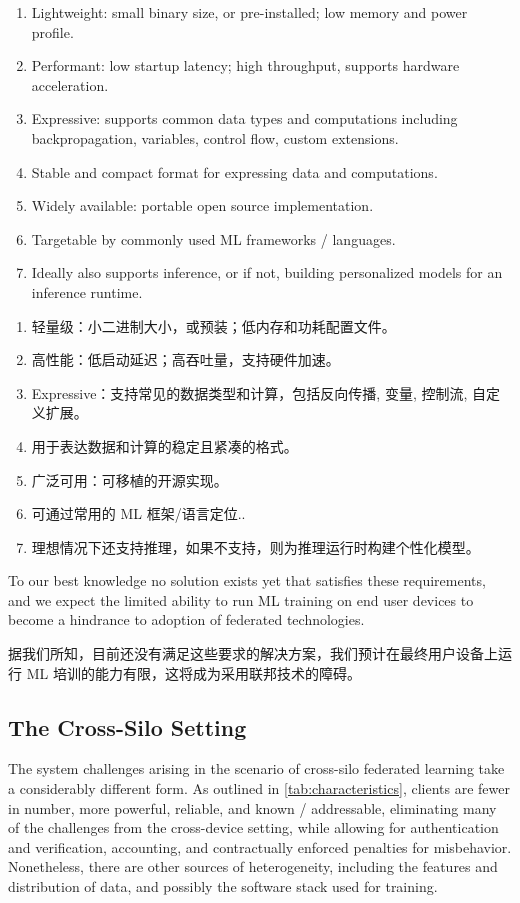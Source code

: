 \begin{enumerate}
    \item Lightweight: small binary size, or pre-installed; low memory and power profile.
    \item Performant: low startup latency; high throughput, supports hardware acceleration.
    \item Expressive: supports common data types and computations including backpropagation, variables, control flow, custom extensions.
    \item Stable and compact format for expressing data and computations.
    \item Widely available: portable open source implementation.
    \item Targetable by commonly used ML frameworks / languages.
    \item Ideally also supports inference, or if not, building personalized models for an inference runtime.
\end{enumerate}
\begin{enumerate}
    \item 轻量级：小二进制大小，或预装；低内存和功耗配置文件。
    \item 高性能：低启动延迟；高吞吐量，支持硬件加速。
    \item Expressive：支持常见的数据类型和计算，包括反向传播, 变量, 控制流, 自定义扩展。
    \item 用于表达数据和计算的稳定且紧凑的格式。
    \item 广泛可用：可移植的开源实现。
    \item 可通过常用的 ML 框架/语言定位..
    \item 理想情况下还支持推理，如果不支持，则为推理运行时构建个性化模型。
\end{enumerate}

To our best knowledge no solution exists yet that satisfies these requirements, and we expect the limited ability to run ML training on end user devices to become a hindrance to adoption of federated technologies.

据我们所知，目前还没有满足这些要求的解决方案，我们预计在最终用户设备上运行 ML 培训的能力有限，这将成为采用联邦技术的障碍。

\subsection{The Cross-Silo Setting}
\label{subsec:systems-cross-silo-setting}
The system challenges arising in the scenario of cross-silo federated learning take a considerably different form. As outlined in \cref{tab:characteristics}, clients are fewer in number, more powerful, reliable, and known / addressable, eliminating many of the challenges from the cross-device setting, while allowing for authentication and verification, accounting, and contractually enforced penalties for misbehavior. Nonetheless, there are other sources of heterogeneity, including the features and distribution of data, and possibly the software stack used for training.

